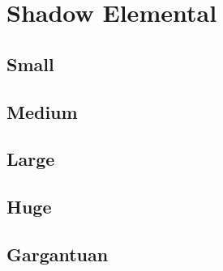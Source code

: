 \section{Shadow Elemental}

\subsection{Small}

\subsection{Medium}

\subsection{Large}

\subsection{Huge}

\subsection{Gargantuan}